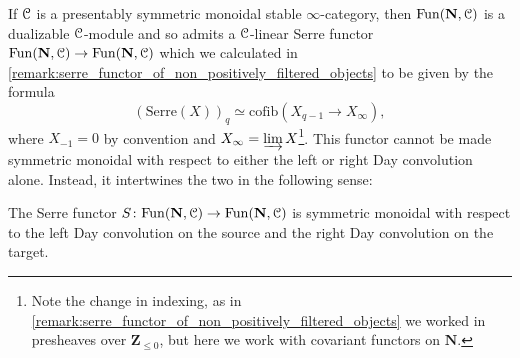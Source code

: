 \documentclass[oneside,a4paper]{amsart}
\begin{document}
If $\EuScript{C}$ is a presentably symmetric monoidal stable $\infty$-category, then $\mathrm{Fun}(\mathbf{N}, \EuScript{C})$ is a dualizable $\EuScript{C}$-module and so admits a $\EuScript{C}$-linear Serre functor $\mathrm{Fun}(\mathbf{N}, \EuScript{C}) \rightarrow \mathrm{Fun}(\mathbf{N}, \EuScript{C})$ which we calculated in \cref{remark:serre_functor_of_non_positively_filtered_objects} to be given by the formula 
\[
(\mathrm{Serre}(X))_{q} \simeq \mathrm{cofib}(X_{q-1} \rightarrow X_{\infty}),
\]
where $X_{-1} = 0$ by convention and $X_{\infty} = \varinjlim X$\footnote{Note the change in indexing, as in \cref{remark:serre_functor_of_non_positively_filtered_objects} we worked in presheaves over $\mathbf{Z}_{\leq 0}$, but here we work with covariant functors on $\mathbf{N}$.}. This functor cannot be made symmetric monoidal with respect to either the left or right Day convolution alone. Instead, it intertwines the two in the following sense: 

\begin{proposition}
\label{proposition:serre_functor_on_fun_n_c_interchanges_left_and_right_day_convolution}
The Serre functor $S \colon \mathrm{Fun}(\mathbf{N}, \EuScript{C}) \rightarrow \mathrm{Fun}(\mathbf{N}, \EuScript{C})$ is symmetric monoidal with respect to the left Day convolution on the source and the right Day convolution on the target. 
\end{proposition}
\end{document}
